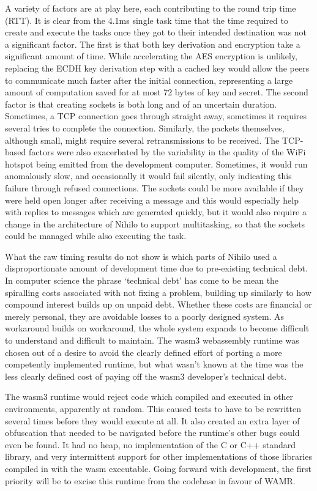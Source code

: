 \documentclass{article}
\begin{document}
A variety of factors are at play here, each contributing to the round trip time (RTT). It is clear from the 4.1ms single task time that the time required to create and execute the tasks once they got to their intended destination was not a significant factor. The first is that both key derivation and encryption take a significant amount of time. While accelerating the AES encryption is unlikely, replacing the ECDH key derivation step with a cached key would allow the peers to communicate much faster after the initial connection, representing a large amount of computation saved for at most 72 bytes of key and secret. The second factor is that creating sockets is both long and of an uncertain duration. Sometimes, a TCP connection goes through straight away, sometimes it requires several tries to complete the connection. Similarly, the packets themselves, although small, might require several retransmissions to be received. The TCP-based factors were also exacerbated by the variability in the quality of the WiFi hotspot being emitted from the development computer. Sometimes, it would run anomalously slow, and occasionally it would fail silently, only indicating this failure through refused connections. The sockets could be more available if they were held open longer after receiving a message and this would especially help with replies to messages which are generated quickly, but it would also require a change in the architecture of Nihilo to support multitasking, so that the sockets could be managed while also executing the task.

What the raw timing results do not show is which parts of Nihilo used a disproportionate amount of development time due to pre-existing technical debt. In computer science the phrase `technical debt' has come to be mean the spiralling costs associated with not fixing a problem, building up similarly to how compound interest builds up on unpaid debt. Whether these costs are financial or merely personal, they are avoidable losses to a poorly designed system. As workaround builds on workaround, the whole system expands to become difficult to understand and difficult to maintain. The wasm3 webassembly runtime was chosen out of a desire to avoid the clearly defined effort of porting a more competently implemented runtime, but what wasn't known at the time was the less clearly defined cost of paying off the wasm3 developer's technical debt. 

The wasm3 runtime would reject code which compiled and executed in other environments, apparently at random. This caused tests to have to be rewritten several times before they would execute at all. It also created an extra layer of obfuscation that needed to be navigated before the runtime's other bugs could even be found. It had no heap, no implementation of the C or C++ standard library, and very intermittent support for other implementations of those libraries compiled in with the wasm executable. Going forward with development, the first priority will be to excise this runtime from the codebase in favour of WAMR.
\end{document}
